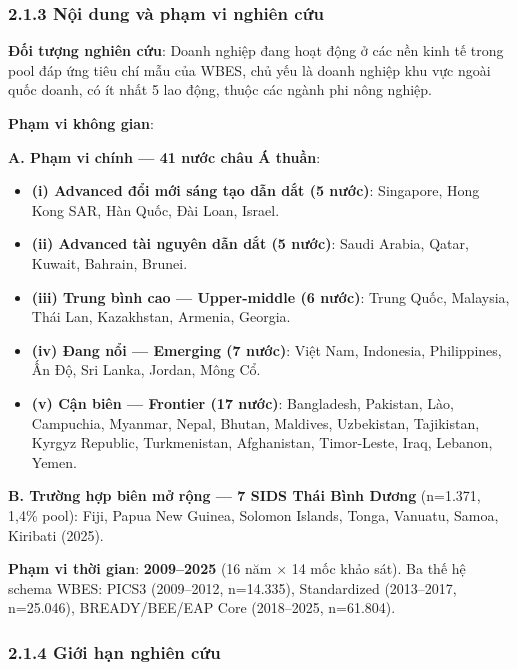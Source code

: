 \documentclass[12pt,a4paper]{article}
\providecommand{\tightlist}{\setlength{\itemsep}{0pt}\setlength{\parskip}{0pt}}
\begin{document}
\hypertarget{213-nux1ed9i-dung-vuxe0-phux1ea1m-vi-nghiuxean-cux1ee9u}{%
\subsubsection{2.1.3 Nội dung và phạm vi nghiên
cứu}\label{213-nux1ed9i-dung-vuxe0-phux1ea1m-vi-nghiuxean-cux1ee9u}}

\textbf{Đối tượng nghiên cứu}: Doanh nghiệp đang hoạt động ở các nền
kinh tế trong pool đáp ứng tiêu chí mẫu của WBES, chủ yếu là doanh
nghiệp khu vực ngoài quốc doanh, có ít nhất 5 lao động, thuộc các ngành
phi nông nghiệp.

\textbf{Phạm vi không gian}:

\textbf{A. Phạm vi chính --- 41 nước châu Á thuần}:

\begin{itemize}
\tightlist
\item
  \textbf{(i) Advanced đổi mới sáng tạo dẫn dắt (5 nước)}: Singapore,
  Hong Kong SAR, Hàn Quốc, Đài Loan, Israel.
\item
  \textbf{(ii) Advanced tài nguyên dẫn dắt (5 nước)}: Saudi Arabia,
  Qatar, Kuwait, Bahrain, Brunei.
\item
  \textbf{(iii) Trung bình cao --- Upper-middle (6 nước)}: Trung Quốc,
  Malaysia, Thái Lan, Kazakhstan, Armenia, Georgia.
\item
  \textbf{(iv) Đang nổi --- Emerging (7 nước)}: Việt Nam, Indonesia,
  Philippines, Ấn Độ, Sri Lanka, Jordan, Mông Cổ.
\item
  \textbf{(v) Cận biên --- Frontier (17 nước)}: Bangladesh, Pakistan,
  Lào, Campuchia, Myanmar, Nepal, Bhutan, Maldives, Uzbekistan,
  Tajikistan, Kyrgyz Republic, Turkmenistan, Afghanistan, Timor-Leste,
  Iraq, Lebanon, Yemen.
\end{itemize}

\textbf{B. Trường hợp biên mở rộng --- 7 SIDS Thái Bình Dương} (n=1.371,
1,4\% pool): Fiji, Papua New Guinea, Solomon Islands, Tonga, Vanuatu,
Samoa, Kiribati (2025).

\textbf{Phạm vi thời gian}: \textbf{2009--2025} (16 năm × 14 mốc khảo
sát). Ba thế hệ schema WBES: PICS3 (2009--2012, n=14.335), Standardized
(2013--2017, n=25.046), BREADY/BEE/EAP Core (2018--2025, n=61.804).

\hypertarget{214-giux1edbi-hux1ea1n-nghiuxean-cux1ee9u}{%
\subsubsection{2.1.4 Giới hạn nghiên
cứu}\label{214-giux1edbi-hux1ea1n-nghiuxean-cux1ee9u}}
\end{document}
